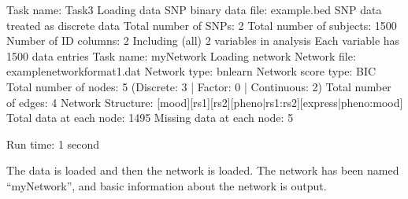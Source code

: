 \documentclass[letterpaper,10pt,english]{sphinxmanual}
\begin{document}
\begin{sphinxVerbatim}[commandchars=\\\{\}]
\PYGZhy{}\PYGZhy{}\PYGZhy{}\PYGZhy{}\PYGZhy{}\PYGZhy{}\PYGZhy{}\PYGZhy{}\PYGZhy{}\PYGZhy{}\PYGZhy{}\PYGZhy{}\PYGZhy{}\PYGZhy{}\PYGZhy{}\PYGZhy{}\PYGZhy{}\PYGZhy{}\PYGZhy{}\PYGZhy{}\PYGZhy{}\PYGZhy{}\PYGZhy{}\PYGZhy{}\PYGZhy{}\PYGZhy{}\PYGZhy{}\PYGZhy{}\PYGZhy{}\PYGZhy{}\PYGZhy{}\PYGZhy{}\PYGZhy{}\PYGZhy{}\PYGZhy{}\PYGZhy{}\PYGZhy{}\PYGZhy{}\PYGZhy{}\PYGZhy{}\PYGZhy{}\PYGZhy{}\PYGZhy{}\PYGZhy{}\PYGZhy{}\PYGZhy{}\PYGZhy{}\PYGZhy{}\PYGZhy{}\PYGZhy{}
Task name: Task\PYGZhy{}3
Loading data
SNP binary data file: example.bed
SNP data treated as discrete data
Total number of SNPs: 2
Total number of subjects: 1500
Number of ID columns: 2
Including (all) 2 variables in analysis
Each variable has 1500 data entries
\PYGZhy{}\PYGZhy{}\PYGZhy{}\PYGZhy{}\PYGZhy{}\PYGZhy{}\PYGZhy{}\PYGZhy{}\PYGZhy{}\PYGZhy{}\PYGZhy{}\PYGZhy{}\PYGZhy{}\PYGZhy{}\PYGZhy{}\PYGZhy{}\PYGZhy{}\PYGZhy{}\PYGZhy{}\PYGZhy{}\PYGZhy{}\PYGZhy{}\PYGZhy{}\PYGZhy{}\PYGZhy{}\PYGZhy{}\PYGZhy{}\PYGZhy{}\PYGZhy{}\PYGZhy{}\PYGZhy{}\PYGZhy{}\PYGZhy{}\PYGZhy{}\PYGZhy{}\PYGZhy{}\PYGZhy{}\PYGZhy{}\PYGZhy{}\PYGZhy{}\PYGZhy{}\PYGZhy{}\PYGZhy{}\PYGZhy{}\PYGZhy{}\PYGZhy{}\PYGZhy{}\PYGZhy{}\PYGZhy{}\PYGZhy{}
\PYGZhy{}\PYGZhy{}\PYGZhy{}\PYGZhy{}\PYGZhy{}\PYGZhy{}\PYGZhy{}\PYGZhy{}\PYGZhy{}\PYGZhy{}\PYGZhy{}\PYGZhy{}\PYGZhy{}\PYGZhy{}\PYGZhy{}\PYGZhy{}\PYGZhy{}\PYGZhy{}\PYGZhy{}\PYGZhy{}\PYGZhy{}\PYGZhy{}\PYGZhy{}\PYGZhy{}\PYGZhy{}\PYGZhy{}\PYGZhy{}\PYGZhy{}\PYGZhy{}\PYGZhy{}\PYGZhy{}\PYGZhy{}\PYGZhy{}\PYGZhy{}\PYGZhy{}\PYGZhy{}\PYGZhy{}\PYGZhy{}\PYGZhy{}\PYGZhy{}\PYGZhy{}\PYGZhy{}\PYGZhy{}\PYGZhy{}\PYGZhy{}\PYGZhy{}\PYGZhy{}\PYGZhy{}\PYGZhy{}\PYGZhy{}
Task name: myNetwork
Loading network
Network file: example\PYGZhy{}network\PYGZhy{}format1.dat
Network type: bnlearn
Network score type: BIC
Total number of nodes: 5 (Discrete: 3 | Factor: 0 | Continuous: 2)
Total number of edges: 4
Network Structure: [mood][rs1][rs2][pheno|rs1:rs2][express|pheno:mood]
Total data at each node: 1495
Missing data at each node: 5
\PYGZhy{}\PYGZhy{}\PYGZhy{}\PYGZhy{}\PYGZhy{}\PYGZhy{}\PYGZhy{}\PYGZhy{}\PYGZhy{}\PYGZhy{}\PYGZhy{}\PYGZhy{}\PYGZhy{}\PYGZhy{}\PYGZhy{}\PYGZhy{}\PYGZhy{}\PYGZhy{}\PYGZhy{}\PYGZhy{}\PYGZhy{}\PYGZhy{}\PYGZhy{}\PYGZhy{}\PYGZhy{}\PYGZhy{}\PYGZhy{}\PYGZhy{}\PYGZhy{}\PYGZhy{}\PYGZhy{}\PYGZhy{}\PYGZhy{}\PYGZhy{}\PYGZhy{}\PYGZhy{}\PYGZhy{}\PYGZhy{}\PYGZhy{}\PYGZhy{}\PYGZhy{}\PYGZhy{}\PYGZhy{}\PYGZhy{}\PYGZhy{}\PYGZhy{}\PYGZhy{}\PYGZhy{}\PYGZhy{}\PYGZhy{}

Run time: 1 second
\end{sphinxVerbatim}

\sphinxAtStartPar
The data is loaded and then the network is loaded. The network has been named “myNetwork”, and basic information about the network is output.
\end{document}
